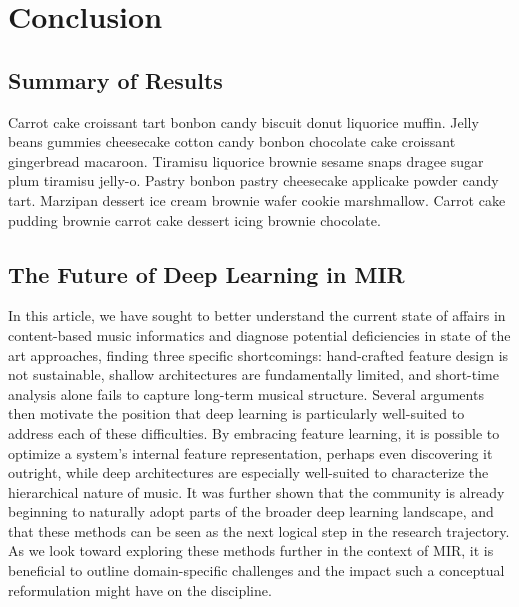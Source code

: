 \graphicspath{{8/figures/}}
\chapter{Conclusion}
\label{chp:conclusion}




\section{Summary of Results}
Carrot cake croissant tart bonbon candy biscuit donut liquorice muffin.
Jelly beans gummies cheesecake cotton candy bonbon chocolate cake croissant gingerbread macaroon.
Tiramisu liquorice brownie sesame snaps dragee sugar plum tiramisu jelly-o.
Pastry bonbon pastry cheesecake applicake powder candy tart.
Marzipan dessert ice cream brownie wafer cookie marshmallow.
Carrot cake pudding brownie carrot cake dessert icing brownie chocolate.


\section{The Future of Deep Learning in MIR}\label{sec:conclusions}
\label{sec:future}

In this article, we have sought to better understand the current state of affairs in content-based music informatics and diagnose potential deficiencies in state of the art approaches, finding three specific shortcomings: hand-crafted feature design is not sustainable, shallow architectures are fundamentally limited, and short-time analysis alone fails to capture long-term musical structure.
Several arguments then motivate the position that deep learning is particularly well-suited to address each of these difficulties.
By embracing feature learning, it is possible to optimize a system's internal feature representation, perhaps even discovering it outright, while deep architectures are especially well-suited to characterize the hierarchical nature of music.
It was further shown that the community is already beginning to naturally adopt parts of the broader deep learning landscape, and that these methods can be seen as the next logical step in the research trajectory.
As we look toward exploring these methods further in the context of MIR, it is beneficial to outline domain-specific challenges and the impact such a conceptual reformulation might have on the discipline.


